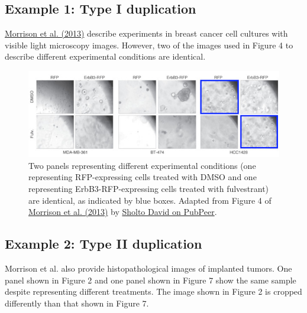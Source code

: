 \documentclass[letterpaper, 12pt]{article}
\begin{document}
\pagebreak

\subsection*{Example 1: Type I duplication}

\href{https://doi.org/10.1172/JCI66764}{Morrison et al. (2013)} describe experiments in breast cancer cell cultures with visible light microscopy images. However, two of the images used in Figure 4 to describe different experimental conditions are identical.

\begin{figure}[h!tbp]
    \centering
    \includegraphics[width=\textwidth]{img/image_duplication/image-1744937326665.jpg}
    \caption*{Two panels representing different experimental conditions (one representing RFP-expressing cells treated with DMSO and one representing ErbB3-RFP-expressing cells treated with fulvestrant) are identical, as indicated by blue boxes. Adapted from Figure 4 of \href{https://doi.org/10.1172/JCI66764}{Morrison et al. (2013)} by \href{https://pubpeer.com/publications/2768B5B42E7338AB72D4CFE660596A\#1}{Sholto David on PubPeer}.}
\end{figure}

\pagebreak

\subsection*{Example 2: Type II duplication}

Morrison et al. also provide histopathological images of implanted tumors. One panel shown in Figure 2 and one panel shown in Figure 7 show the same sample despite representing different treatments. The image shown in Figure 2 is cropped differently than that shown in Figure 7.
\end{document}
